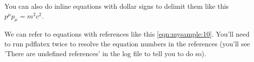 \documentclass{article}
\begin{document}
You can also do inline equations with dollar signs to delimit them like this $p^\mu p_\mu = m^2 c^2$.

We can refer to equations with references like this \ref{eqn:mysample:10}.  You'll need to run pdflatex twice to resolve the equation numbers in the references (you'll see 'There are undefined references' in the log file to tell you to do so).
\end{document}
